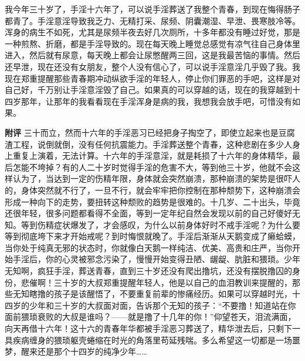 \begin{case}
    我今年三十岁了，手淫十六年了，可以说手淫葬送了我整个青春，到现在悔得肠子都青了。手淫意淫导致我乏力、无精打采、尿频、阴囊潮湿、早泄、畏寒肢冷等。浑身的病生不如死，尤其是尿频半夜去好几次厕所，十多年都没有睡过好觉，那是一种煎熬、折磨，都是手淫导致的。现在每天晚上睡觉总感觉有凉气往自己身体里进入，然后就有尿意，每天晚上都会让尿憋醒两三回，这是我最苦恼的事情。然后还早泄，现在还没有女朋友，整个人没有信心了，可以说手淫意淫几乎毁了我。我现在郑重提醒那些青春期冲动纵欲手淫的年轻人，停止你们罪恶的手吧，这样是对自己好，千万别让手淫意淫毁了自己。如果真的可以穿越的话，现在的我穿越到十四岁那年，让那年的我看看现在手淫浑身是病的我，我想我会放手吧，可惜没有如果。

    \textbf{附评} 三十而立，然而十六年的手淫恶习已经把身子掏空了，即使立起来也是豆腐渣工程，说倒就倒，没有任何抗震能力。手淫葬送整个青春，这种悲剧在多少人身上重复上演着，无法计算。十六年的手淫意淫，就是耗损了十六年的身体精华，最后怎能不垮掉？有的人二十岁时觉得手淫的危害不大，等到他三十岁，他就不会这样认为了，当达到一定的伤精年限，身体就会突然崩溃，那种崩溃的架势是很吓人的，身体突然就不行了，一旦不行，就会牢牢把你控制在那种颓势下，这种崩溃会形成一种向下的走势，要扭转这种颓败的趋势是很难的。十几岁、二十出头，毕竟还很年轻，很多问题都看得不全面，等到一定年纪自然会发现以前的自己好傻好无知。等到伤精症状爆发了，才会感叹，为什么以前身体好时不戒手淫呢？为什么要等到彻底垮下来才开始戒呢？到时悔恨就晚了。手淫后渐渐从天鹅变成了癞蛤蟆，当你处于纯真无邪的状态时，你就像白天鹅一样纯洁、优美、高贵和庄严，当你开始手淫后，你的心灵被邪念污染了，慢慢开始变得丑陋、龌龊、肮脏和猥琐。少年无知啊，疯狂手淫，葬送青春，直到三十岁还没有爬出撸坑，还没有摆脱撸囚的身份，悲催啊！三十岁的大叔郑重提醒年轻人，他是以自己的血泪教训来提醒的，那些无知瞎撸的孩子是该醒悟了，不要重复前辈的惨痛经历。如果可以穿越时光，十四岁的少年和三十岁的大叔面对面，告诉那个无知的孩子：“不要撸！知道站在你面前猥琐衰败的大叔是谁吗？——就是撸了十几年的你！”仰望苍天，泪流满面，向天再借十六年！这十六的青春年华都被手淫恶习葬送了，精华泄去后，只剩下一具疾病缠身的猥琐躯壳蜷缩在时光的角落里苟延残喘。多么希望这一切都是一场噩梦，醒来还是那个十四岁的纯净少年……
\end{case}

